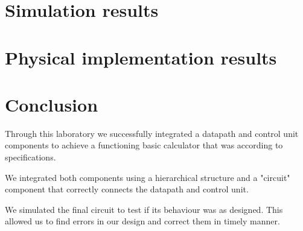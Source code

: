 \documentclass[12pt]{article}
\begin{document}
\section{Simulation results}

\section{Physical implementation results}

\section{Conclusion}

Through this laboratory we successfully integrated a datapath and control unit components to achieve a functioning basic calculator that was according to specifications.

We integrated both components using a hierarchical structure and a "circuit" component that correctly connects the datapath and control unit.

We simulated the final circuit to test if its behaviour was as designed. This allowed us to find errors in our design and correct them in timely manner.
\end{document}
